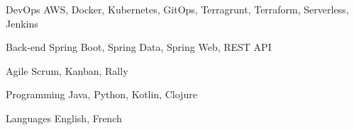

\begin{cvskills}

  \cvskill
    {DevOps} %
    {AWS, Docker, Kubernetes, GitOps, Terragrunt, Terraform, Serverless, Jenkins} %

  \cvskill
    {Back-end} %
    {Spring Boot, Spring Data, Spring Web, REST API} %

  \cvskill
    {Agile} %
    {Scrum, Kanban, Rally} %

  \cvskill
    {Programming} %
    {Java, Python, Kotlin, Clojure} %

  \cvskill
    {Languages} %
    {English, French} %

\end{cvskills}

